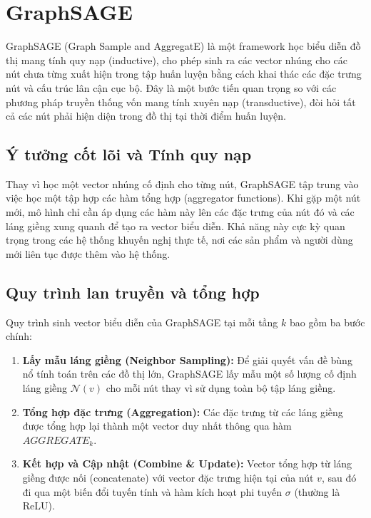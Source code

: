 \section{GraphSAGE}

GraphSAGE (Graph Sample and AggregatE) là một framework học biểu diễn đồ thị mang tính quy nạp (inductive), cho phép sinh ra các vector nhúng cho các nút chưa từng xuất hiện trong tập huấn luyện bằng cách khai thác các đặc trưng nút và cấu trúc lân cận cục bộ. Đây là một bước tiến quan trọng so với các phương pháp truyền thống vốn mang tính xuyên nạp (transductive), đòi hỏi tất cả các nút phải hiện diện trong đồ thị tại thời điểm huấn luyện.

\subsection{Ý tưởng cốt lõi và Tính quy nạp}

Thay vì học một vector nhúng cố định cho từng nút, GraphSAGE tập trung vào việc học một tập hợp các hàm tổng hợp (aggregator functions). Khi gặp một nút mới, mô hình chỉ cần áp dụng các hàm này lên các đặc trưng của nút đó và các láng giềng xung quanh để tạo ra vector biểu diễn. Khả năng này cực kỳ quan trọng trong các hệ thống khuyến nghị thực tế, nơi các sản phẩm và người dùng mới liên tục được thêm vào hệ thống.

\subsection{Quy trình lan truyền và tổng hợp}

Quy trình sinh vector biểu diễn của GraphSAGE tại mỗi tầng $k$ bao gồm ba bước chính:

\begin{enumerate}
    \item \textbf{Lấy mẫu láng giềng (Neighbor Sampling):} Để giải quyết vấn đề bùng nổ tính toán trên các đồ thị lớn, GraphSAGE lấy mẫu một số lượng cố định láng giềng $\mathcal{N}(v)$ cho mỗi nút thay vì sử dụng toàn bộ tập láng giềng.
    \item \textbf{Tổng hợp đặc trưng (Aggregation):} Các đặc trưng từ các láng giềng được tổng hợp lại thành một vector duy nhất thông qua hàm $AGGREGATE_k$.
    \item \textbf{Kết hợp và Cập nhật (Combine \& Update):} Vector tổng hợp từ láng giềng được nối (concatenate) với vector đặc trưng hiện tại của nút $v$, sau đó đi qua một biến đổi tuyến tính và hàm kích hoạt phi tuyến $\sigma$ (thường là ReLU).
\end{enumerate}

